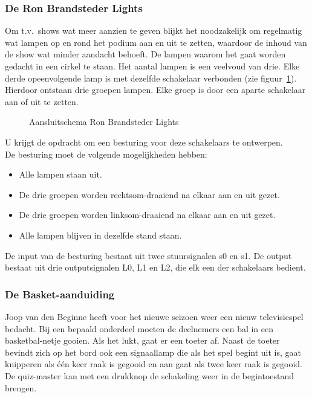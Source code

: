 \subsubsection{De Ron Brandsteder Lights}

Om t.v.\ shows wat meer aanzien te geven blijkt het noodzakelijk om regelmatig wat
lampen op en rond het podium aan en uit te zetten, waardoor de inhoud van de show
wat minder aandacht behoeft.
De lampen waarom het gaat worden gedacht in een cirkel te staan. Het aantal
lampen is een veelvoud van drie. Elke derde opeenvolgende lamp is met dezelfde
schakelaar verbonden (zie figuur~\ref{lampen}). Hierdoor ontstaan drie groepen
lampen. Elke groep is door een aparte schakelaar aan of uit te zetten.

\begin{figure}[hb]
\centerline{}
\caption{Aansluitschema Ron Brandsteder Lights}
\label{lampen}
\end{figure}

U krijgt de opdracht om een besturing voor deze schakelaars te ontwerpen.\\
De besturing moet de volgende mogelijkheden hebben:
\begin{itemize}
\item
Alle lampen staan uit.
\item
De drie groepen worden rechtsom-draaiend na elkaar aan en uit gezet.
\item
De drie groepen worden linksom-draaiend na elkaar aan en uit gezet.
\item
Alle lampen blijven in dezelfde stand staan.
\end{itemize}
De input van de besturing bestaat uit twee stuursignalen s0 en s1.
De output bestaat uit drie outputsignalen L0, L1 en L2, die elk een der
schakelaars bedient.
\clearpage

\subsubsection{De Basket-aanduiding}

Joop van den Beginne heeft voor het nieuwe seizoen weer een nieuw 
televisiespel bedacht. Bij een bepaald onderdeel moeten de deelnemers
een bal in een basketbal-netje gooien.
Als het lukt, gaat er een toeter af. Naast de toeter bevindt zich op 
het bord ook een signaallamp die als het spel begint uit is, gaat
knipperen als \'e\'en keer raak is gegooid en aan gaat als twee keer 
raak is gegooid. De quiz-master kan met een drukknop de schakeling
weer in de begintoestand brengen.


